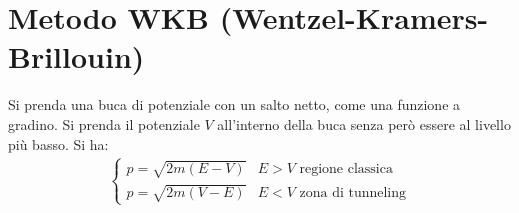 \section[Metodo WKB]{Metodo WKB (Wentzel-Kramers-Brillouin)} %
Si prenda una buca di potenziale con un salto netto, come una funzione a gradino. Si prenda il potenziale $V$ all'interno della buca senza però essere al livello più basso. Si ha:
\begin{equation}\begin{split}
\begin{cases}
p=\sqrt{2m\left(E-V\right)} & E>V \textrm{ regione classica}\\
p=\sqrt{2m\left(V-E\right)} & E< V \textrm{ zona di tunneling}
\end{cases}
\end{split}\end{equation}

